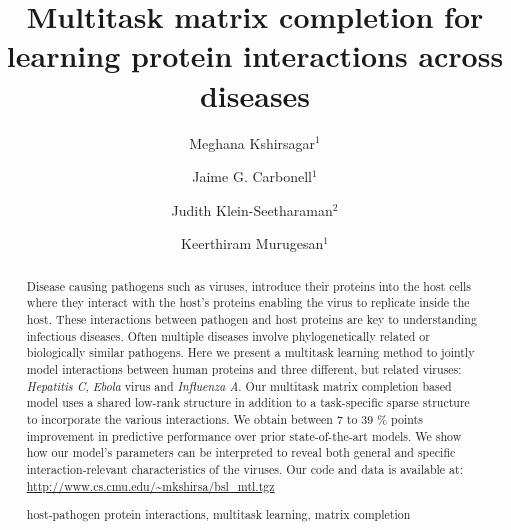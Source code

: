 \documentclass[runningheads,a4paper]{llncs}
\newcommand{\keywords}[1]{\par\addvspace\baselineskip
\noindent\keywordname\enspace\ignorespaces#1}
\begin{document}
\mainmatter  

\title{Multitask matrix completion for learning protein interactions across diseases}


\author{Meghana Kshirsagar$^{1}$%
\and Jaime G. Carbonell$^{1}$
\and Judith Klein-Seetharaman$^{2}$
\and Keerthiram Murugesan$^{1}$}



\maketitle

\begin{abstract}

Disease causing pathogens such as viruses, introduce their proteins into the host cells 
where they interact with the host's proteins enabling the virus to replicate inside the host.
These interactions between pathogen and host proteins are key to understanding infectious diseases.
Often multiple diseases involve phylogenetically related or biologically similar pathogens. Here we present a multitask learning method to jointly model interactions between human proteins and three different, but related viruses: \textit{Hepatitis C}, \textit{Ebola} virus and \textit{Influenza A}. 
Our multitask matrix completion based model uses a shared low-rank structure in addition to a task-specific sparse structure to incorporate the various interactions.
We obtain between 7 to 39 \% points improvement in predictive performance over prior state-of-the-art models. 
We show how our model's parameters can be interpreted to reveal both general and specific
interaction-relevant characteristics of the viruses. Our code and data is available at: \url{http://www.cs.cmu.edu/~mkshirsa/bsl_mtl.tgz}
\keywords{host-pathogen protein interactions, multitask learning, matrix completion}
\end{abstract}
\end{document}
